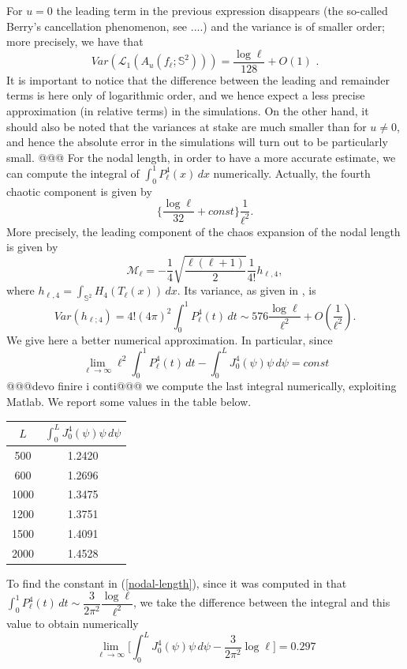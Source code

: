 \documentclass[aps,prd,showpacs,superscriptaddress,groupedaddress]{revtex4-1}  %
\begin{document}
For $u=0$ the leading term in the previous expression disappears (the so-called Berry's cancellation phenomenon, see ....) and the variance is of smaller order; more precisely, we have that
\begin{equation*}
Var \left( \mathcal{L}_{1}(A_{u}(f_{\ell };\mathbb{S}^{2})) \right) =\frac{\log \ell}{128}+O(1) \text{ .}
\end{equation*}
It is important to notice that the difference between the leading and remainder terms is here only of logarithmic order, and we hence expect a less precise approximation (in relative terms) in the simulations. On the other hand, it should also be noted that the variances at stake are much smaller than for $u \neq 0$, and hence the absolute error in the simulations will turn out to be particularly small.
@@@
For the nodal length, in order to have a more accurate estimate, we can compute the integral of $\int_{0}^{1} P_\ell^4(x) \,dx$ numerically. Actually, the fourth chaotic component is given by 
\begin{equation}\label{nodal-length}
\bigg\{\dfrac{\log \ell}{32}+const\bigg\} \dfrac{1}{\ell^2}.
\end{equation}
More precisely, the leading component of the chaos expansion of the nodal length is given by
$$\mathcal{M}_\ell=-\dfrac{1}{4} \sqrt{\dfrac{\ell(\ell+1)}{2}} \dfrac{1}{4!} h_{\ell,4},$$
where $h_{\ell,4}=\int_{\mathbb{S}^2}H_4(T_\ell(x))\,dx$. Its variance, as given in \cite{}, is
$$Var(h_{\ell;4})=4! (4\pi)^2 \int_{0}^{1} P_\ell^4(t) \,dt \sim 576 \frac{\log \ell}{\ell^2}+O(\frac{1}{\ell^2}).$$ We give here a better numerical approximation. In particular, since
$$\lim_{\ell \rightarrow \infty} \ell^2 \int_{0}^{1} P_\ell^4(t)\, dt - \int_{0}^{L} J_0^4(\psi) \psi \,d\psi=const$$ @@@devo finire i conti@@@ we compute the last integral numerically, exploiting Matlab. We report some values in the table below.
\begin{center}
\begin{tabular}{|c|c|}
	\hline
	$L$ &\textbf{	$\int_{0}^{L} J_0^4(\psi)\psi\,d\psi$ } \\
	\hline 500 & 1.2420\\
	\hline 600&  1.2696\\
	\hline  1000 &  1.3475 \\
	\hline 1200 & 1.3751\\
	\hline 1500 & 1.4091 \\
	\hline 2000 & 1.4528 \\
	\hline
\end{tabular}
\end{center}
To find the constant in (\ref{nodal-length}), since it was computed in \cite{} that $\int_{0}^{1} P_\ell^4(t) \,dt \sim \dfrac{3}{2\pi^2} \dfrac{\log \ell}{\ell^2}$, we take the difference between the integral and this value to obtain numerically
\begin{equation}\label{1}
    \lim_{\ell \rightarrow \infty} \big[\int_{0}^{L} J_0^4(\psi) \psi \, d\psi -\dfrac{3}{2\pi^2} \log \ell \big]=0.297
\end{equation}
\end{document}
